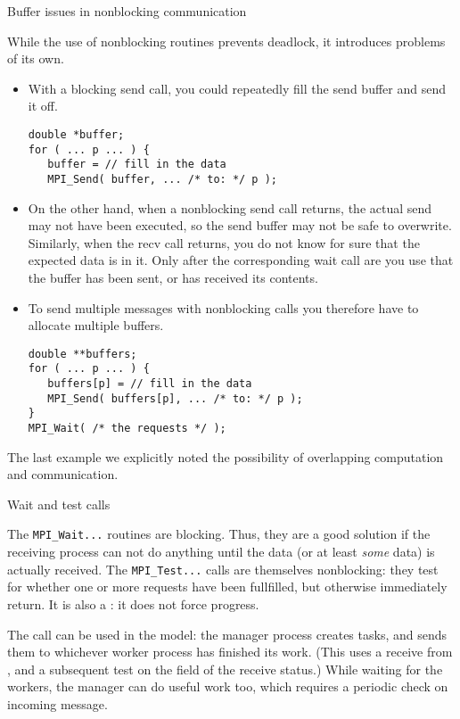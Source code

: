  {Buffer issues in nonblocking communication}

While the use of nonblocking routines prevents deadlock, it
introduces problems of its own.

\begin{itemize}
\item With a blocking send call, you could repeatedly fill the send
  buffer and send it off.
\begin{lstlisting}
double *buffer;
for ( ... p ... ) {
   buffer = // fill in the data
   MPI_Send( buffer, ... /* to: */ p );
\end{lstlisting}
\item On the other hand, when a nonblocking send call returns,
  the actual send may not have been executed,
  so the send buffer may not be safe to overwrite.
  Similarly, when the recv call returns, you do not know for sure that
  the expected data is in it. Only after the corresponding wait call
  are you use that the buffer has been sent, or has received its contents.
\item 
  To send multiple messages with nonblocking calls
  you therefore have to allocate multiple buffers.
\begin{lstlisting}
double **buffers;
for ( ... p ... ) {
   buffers[p] = // fill in the data
   MPI_Send( buffers[p], ... /* to: */ p );
}
MPI_Wait( /* the requests */ );
\end{lstlisting}
\end{itemize}


The last example we explicitly noted the possibility of
overlapping computation and communication.

 {Wait and test calls}
\label{sec:mpitest}
\label{sec:mpi-test}

The \lstinline{MPI_Wait...} routines are blocking. Thus, they are a good solution if 
the receiving process can not do anything until the data 
(or at least \emph{some} data) is actually received.
The \lstinline{MPI_Test...} calls are themselves nonblocking: they
test for whether one or more requests have been
fullfilled, but otherwise immediately return.
It is also a : it does not force progress.

The  call can be used in the
 model: the manager process creates tasks, and
sends them to whichever worker process has finished its work.
(This uses a receive from , and a
subsequent test on the  field of the receive status.)
While waiting for the workers, the manager can do useful work too,
which requires a periodic check on incoming message.

